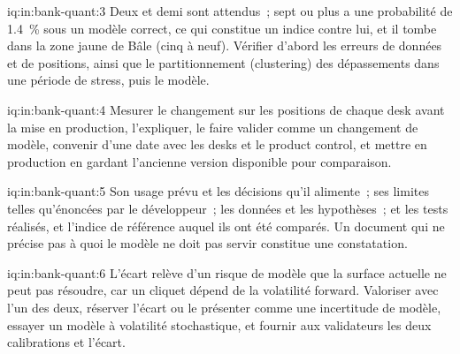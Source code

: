 \begin{solution}{iq:in:bank-quant:3}
Deux et demi sont attendus~; sept ou plus a une probabilité de 1.4~\% sous un modèle correct, ce qui constitue un indice contre lui, et
il tombe dans la zone jaune de Bâle (cinq à neuf). Vérifier d'abord les erreurs de données et de positions, ainsi que le partitionnement (clustering) des dépassements dans une
période de stress, puis le modèle.
\end{solution}

\begin{solution}{iq:in:bank-quant:4}
Mesurer le changement sur les positions de chaque desk avant la mise en production, l'expliquer, le faire valider comme un changement de modèle, convenir d'une date
avec les desks et le product control, et mettre en production en gardant l'ancienne version disponible pour comparaison.
\end{solution}

\begin{solution}{iq:in:bank-quant:5}
Son usage prévu et les décisions qu'il alimente~; ses limites telles qu'énoncées par le développeur~; les données et les hypothèses~; et les tests réalisés,
et l'indice de référence auquel ils ont été comparés. Un document qui ne précise pas à quoi le modèle ne doit pas servir constitue une constatation.
\end{solution}

\begin{solution}{iq:in:bank-quant:6}
L'écart relève d'un risque de modèle que la surface actuelle ne peut pas résoudre, car un cliquet dépend de la volatilité forward.
Valoriser avec l'un des deux, réserver l'écart ou le présenter comme une incertitude de modèle, essayer un modèle à volatilité stochastique, et fournir
aux validateurs les deux calibrations et l'écart.
\end{solution}
